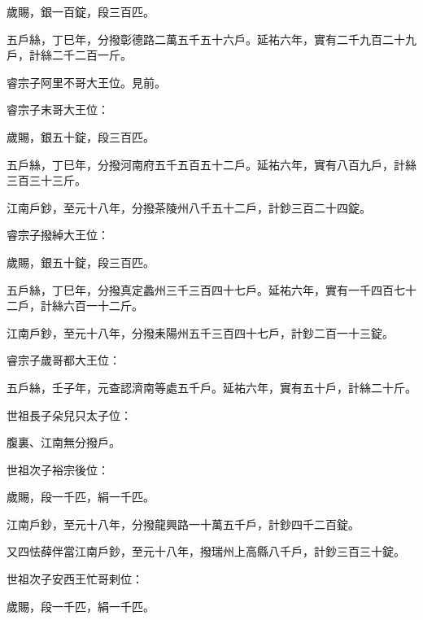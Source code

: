 \begin{pinyinscope}
 歲賜，銀一百錠，段三百匹。



 五戶絲，丁巳年，分撥彰德路二萬五千五十六戶。延祐六年，實有二千九百二十九戶，計絲二千二百一斤。



 睿宗子阿里不哥大王位。見前。



 睿宗子末哥大王位：



 歲賜，銀五十錠，段三百匹。



 五戶絲，丁巳年，分撥河南府五千五百五十二戶。延祐六年，實有八百九戶，計絲三百三十三斤。



 江南戶鈔，至元十八年，分撥茶陵州八千五十二戶，計鈔三百二十四錠。



 睿宗子撥綽大王位：



 歲賜，銀五十錠，段三百匹。



 五戶絲，丁巳年，分撥真定蠡州三千三百四十七戶。延祐六年，實有一千四百七十二戶，計絲六百一十二斤。



 江南戶鈔，至元十八年，分撥耒陽州五千三百四十七戶，計鈔二百一十三錠。



 睿宗子歲哥都大王位：



 五戶絲，壬子年，元查認濟南等處五千戶。延祐六年，實有五十戶，計絲二十斤。



 世祖長子朵兒只太子位：



 腹裏、江南無分撥戶。



 世祖次子裕宗後位：



 歲賜，段一千匹，絹一千匹。



 江南戶鈔，至元十八年，分撥龍興路一十萬五千戶，計鈔四千二百錠。



 又四怯薛伴當江南戶鈔，至元十八年，撥瑞州上高縣八千戶，計鈔三百三十錠。



 世祖次子安西王忙哥剌位：



 歲賜，段一千匹，絹一千匹。




\end{pinyinscope}
